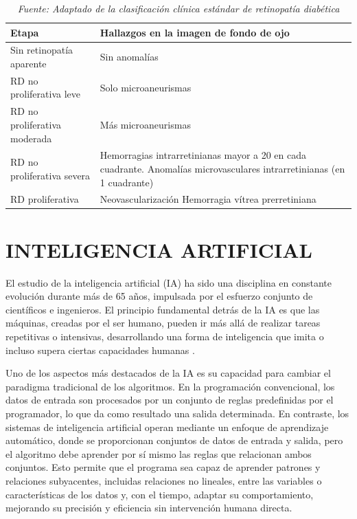 \begin{table}[H]
\centering
\renewcommand{\arraystretch}{1.5}
\caption{Etapas de la retinopatía diabética y sus manifestaciones clínicas en imágenes de
fondo de ojo}
\label{tab:etapas-rd}
\begin{tabularx}{\textwidth}{X X}
\hline
\textbf{Etapa} & \textbf{Hallazgos en la imagen de fondo de ojo} \\ \hline
Sin retinopatía aparente & Sin anomalías \\
RD no proliferativa leve & Solo microaneurismas \\
RD no proliferativa moderada & Más microaneurismas \\
RD no proliferativa severa & Hemorragias intrarretinianas mayor a 20 en cada
cuadrante.\newline
Anomalías microvasculares intrarretinianas (en 1 cuadrante) \\
RD proliferativa & Neovascularización\newline
Hemorragia vítrea prerretiniana \\ \hline
\end{tabularx}
\caption*{\textit{Fuente: Adaptado de la clasificación clínica estándar de retinopatía diabética}}
\end{table}

\section{INTELIGENCIA ARTIFICIAL}

El estudio de la inteligencia artificial (IA) ha sido una disciplina en constante
evolución durante más de 65 años, impulsada por el esfuerzo conjunto de científicos e
ingenieros. El principio fundamental detrás de la IA es que las máquinas, creadas por el
ser humano, pueden ir más allá de realizar tareas repetitivas o intensivas, desarrollando
una forma de inteligencia que imita o incluso supera ciertas capacidades humanas
.

Uno de los aspectos más destacados de la IA es su capacidad para cambiar el paradigma
tradicional de los algoritmos. En la programación convencional, los datos de entrada son
procesados por un conjunto de reglas predefinidas por el programador, lo que da como
resultado una salida determinada. En contraste, los sistemas de inteligencia artificial
operan mediante un enfoque de aprendizaje automático, donde se proporcionan conjuntos de
datos de entrada y salida, pero el algoritmo debe aprender por sí mismo las reglas que
relacionan ambos conjuntos. Esto permite que el programa sea capaz de aprender patrones
y relaciones subyacentes, incluidas relaciones no lineales, entre las variables o
características de los datos y, con el tiempo, adaptar su comportamiento,
mejorando su precisión y eficiencia sin intervención humana directa.

